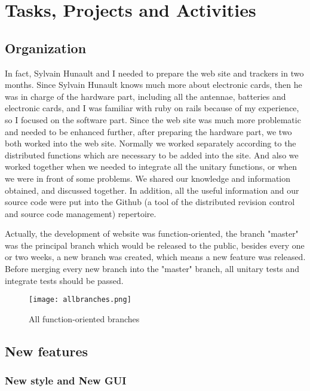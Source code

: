 \section{Tasks, Projects and Activities}
\subsection{Organization}
In fact, Sylvain Hunault and I needed to prepare the web site and trackers in two months. Since Sylvain Hunault knows much more about electronic cards, then he was in charge of the hardware part, including all the antennae, batteries and electronic cards, and I was familiar with ruby on rails because of my experience, so I focused on the software part. Since the web site was much more problematic and needed to be enhanced further, after preparing the hardware part, we two both worked into the web site. Normally we worked separately according to the distributed functions which are necessary to be added into the site. And also we worked together when we needed to integrate all the unitary functions, or when we were in front of some problems. We shared our knowledge and information obtained, and discussed together. In addition, all the useful information and our source code were put into the Github (a tool of the distributed revision control and source code management) repertoire.


Actually, the development of website was function-oriented, the branch "master" was the principal branch which would be released to the public, besides every one or two weeks, a new branch was created, which means a new feature was released. Before merging every new branch into the "master" branch, all unitary tests and integrate tests should be passed. 
\begin{figure}[h!]
    \centering
    \texttt{[image: allbranches.png]}
    \caption{All function-oriented branches }
    \label{fig-sample}
\end{figure}

\subsection{New features}
\subsubsection{New style and New GUI}

